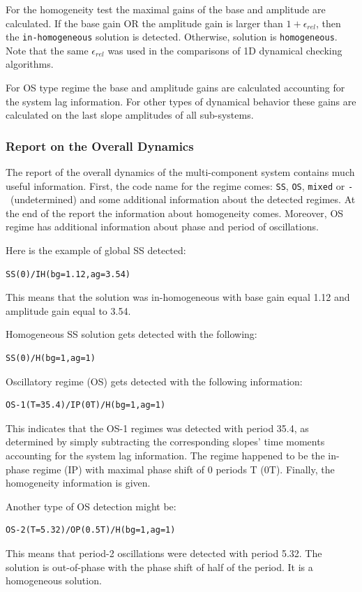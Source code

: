 \documentclass[11pt,a4paper]{article}
\begin{document}
For the homogeneity test the maximal gains of the base and amplitude are
calculated. If the base gain OR the amplitude gain is larger than $1+\epsilon_{rel}$,
then the \texttt{in-homogeneous} solution is detected. Otherwise, solution is
\texttt{homogeneous}. Note that the same $\epsilon_{rel}$ was used in the comparisons
of 1D dynamical checking algorithms.

For OS type regime the base and amplitude gains are calculated accounting for the
system lag information. For other types of dynamical behavior these gains are
calculated on the last slope amplitudes of all sub-systems.


\subsubsection{Report on the Overall Dynamics}
\label{sec:report-over-dynam}

The report of the overall dynamics of the multi-component system contains much useful
information. First, the code name for the regime comes: \texttt{SS}, \texttt{OS},
\texttt{mixed} or \texttt{-}~(undetermined) and some additional information about the
detected regimes. At the end of the report the information about homogeneity
comes. Moreover, OS regime has additional information about phase and period of
oscillations.

Here is the example of global SS detected:
\begin{verbatim}
SS(0)/IH(bg=1.12,ag=3.54)
\end{verbatim}
This means that the solution was in-homogeneous with base gain equal 1.12 and
amplitude gain equal to 3.54.

Homogeneous SS solution gets detected with the following:
\begin{verbatim}
SS(0)/H(bg=1,ag=1)
\end{verbatim}

Oscillatory regime (OS) gets detected with the following information:
\begin{verbatim}
OS-1(T=35.4)/IP(0T)/H(bg=1,ag=1)
\end{verbatim}
This indicates that the OS-1 regimes was detected with period 35.4, as determined by
simply subtracting the corresponding slopes' time moments accounting for the system
lag information. The regime happened to be the in-phase regime (IP) with maximal
phase shift of 0 periods T (0T). Finally, the homogeneity information is given.

Another type of OS detection might be:
\begin{verbatim}
OS-2(T=5.32)/OP(0.5T)/H(bg=1,ag=1)
\end{verbatim}
This means that period-2 oscillations were detected with period 5.32. The solution is
out-of-phase with the phase shift of half of the period. It is a homogeneous
solution.
\end{document}
